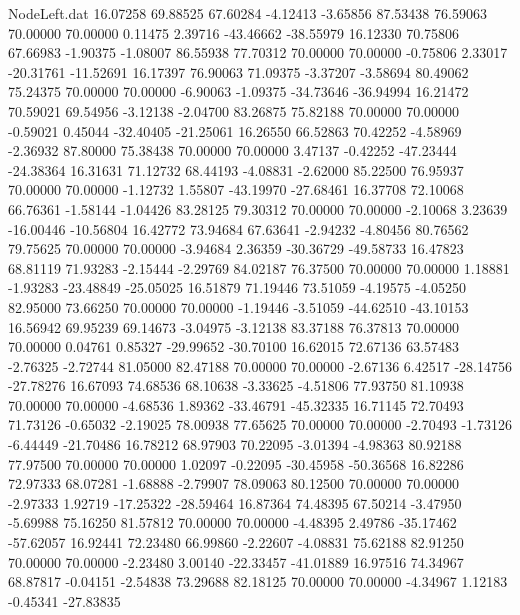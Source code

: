 \begin{filecontents}{NodeLeft.dat}
  16.07258   69.88525   67.60284    -4.12413   -3.65856   87.53438   76.59063   70.00000   70.00000    0.11475    2.39716  -43.46662  -38.55979
  16.12330   70.75806   67.66983    -1.90375   -1.08007   86.55938   77.70312   70.00000   70.00000   -0.75806    2.33017  -20.31761  -11.52691
  16.17397   76.90063   71.09375    -3.37207   -3.58694   80.49062   75.24375   70.00000   70.00000   -6.90063   -1.09375  -34.73646  -36.94994
  16.21472   70.59021   69.54956    -3.12138   -2.04700   83.26875   75.82188   70.00000   70.00000   -0.59021    0.45044  -32.40405  -21.25061
  16.26550   66.52863   70.42252    -4.58969   -2.36932   87.80000   75.38438   70.00000   70.00000    3.47137   -0.42252  -47.23444  -24.38364
  16.31631   71.12732   68.44193    -4.08831   -2.62000   85.22500   76.95937   70.00000   70.00000   -1.12732    1.55807  -43.19970  -27.68461
  16.37708   72.10068   66.76361    -1.58144   -1.04426   83.28125   79.30312   70.00000   70.00000   -2.10068    3.23639  -16.00446  -10.56804
  16.42772   73.94684   67.63641    -2.94232   -4.80456   80.76562   79.75625   70.00000   70.00000   -3.94684    2.36359  -30.36729  -49.58733
  16.47823   68.81119   71.93283    -2.15444   -2.29769   84.02187   76.37500   70.00000   70.00000    1.18881   -1.93283  -23.48849  -25.05025
  16.51879   71.19446   73.51059    -4.19575   -4.05250   82.95000   73.66250   70.00000   70.00000   -1.19446   -3.51059  -44.62510  -43.10153
  16.56942   69.95239   69.14673    -3.04975   -3.12138   83.37188   76.37813   70.00000   70.00000    0.04761    0.85327  -29.99652  -30.70100
  16.62015   72.67136   63.57483    -2.76325   -2.72744   81.05000   82.47188   70.00000   70.00000   -2.67136    6.42517  -28.14756  -27.78276
  16.67093   74.68536   68.10638    -3.33625   -4.51806   77.93750   81.10938   70.00000   70.00000   -4.68536    1.89362  -33.46791  -45.32335
  16.71145   72.70493   71.73126    -0.65032   -2.19025   78.00938   77.65625   70.00000   70.00000   -2.70493   -1.73126   -6.44449  -21.70486
  16.78212   68.97903   70.22095    -3.01394   -4.98363   80.92188   77.97500   70.00000   70.00000    1.02097   -0.22095  -30.45958  -50.36568
  16.82286   72.97333   68.07281    -1.68888   -2.79907   78.09063   80.12500   70.00000   70.00000   -2.97333    1.92719  -17.25322  -28.59464
  16.87364   74.48395   67.50214    -3.47950   -5.69988   75.16250   81.57812   70.00000   70.00000   -4.48395    2.49786  -35.17462  -57.62057
  16.92441   72.23480   66.99860    -2.22607   -4.08831   75.62188   82.91250   70.00000   70.00000   -2.23480    3.00140  -22.33457  -41.01889
  16.97516   74.34967   68.87817    -0.04151   -2.54838   73.29688   82.18125   70.00000   70.00000   -4.34967    1.12183   -0.45341  -27.83835

\end{filecontents}
